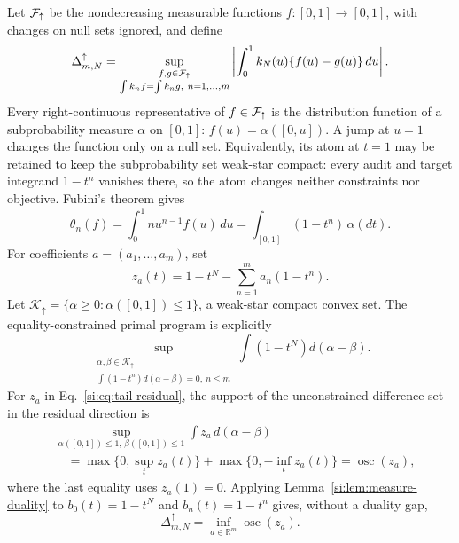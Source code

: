 Let $\mathcal F_\uparrow$ be the nondecreasing measurable functions $f:[0,1]\to[0,1]$, with changes on null sets ignored, and define
\begin{equation}
\Delta^\uparrow_{m,N}
=\sup_{\substack{f,g\in\mathcal F_\uparrow\\
\int k_nf=\int k_ng,\ n=1,\ldots,m}}
\left|\int_0^1 k_N(u)\{f(u)-g(u)\}\,du\right|.
\label{si:eq:monotone-ambiguity}
\end{equation}
Every right-continuous representative of $f\in\mathcal F_\uparrow$ is the distribution function of a subprobability measure $\alpha$ on $[0,1]$: $f(u)=\alpha([0,u])$. A jump at $u=1$ changes the function only on a null set. Equivalently, its atom at $t=1$ may be retained to keep the subprobability set weak-star compact: every audit and target integrand $1-t^n$ vanishes there, so the atom changes neither constraints nor objective. Fubini's theorem gives
\begin{equation}
\theta_n(f)
=\int_0^1nu^{n-1}f(u)\,du
=\int_{[0,1]}(1-t^n)\,\alpha(dt).
\label{si:eq:cdf-tail-moments}
\end{equation}
For coefficients $a=(a_1,\ldots,a_m)$, set
\begin{equation}
z_a(t)=1-t^N-\sum_{n=1}^ma_n(1-t^n).
\label{si:eq:tail-residual}
\end{equation}
Let $\mathcal K_\uparrow=\{\alpha\ge0:\alpha([0,1])\le1\}$, a weak-star compact
convex set. The equality-constrained primal program is explicitly
\begin{equation}
\sup_{\substack{\alpha,\beta\in\mathcal K_\uparrow\\
\int(1-t^n)d(\alpha-\beta)=0,\ n\le m}}
\int(1-t^N)d(\alpha-\beta).
\label{si:eq:monotone-measure-primal}
\end{equation}
For $z_a$ in Eq.~\ref{si:eq:tail-residual}, the support of the unconstrained
difference set in the residual direction is
\begin{align}
&\sup_{\alpha([0,1])\le1,\,\beta([0,1])\le1}
\int z_a\,d(\alpha-\beta)\nonumber\\
&\quad=\max\{0,\sup_tz_a(t)\}+\max\{0,-\inf_tz_a(t)\}
=\operatorname{osc}(z_a),
\label{si:eq:osc-support}
\end{align}
where the last equality uses $z_a(1)=0$. Applying
Lemma~\ref{si:lem:measure-duality} to
$b_0(t)=1-t^N$ and $b_n(t)=1-t^n$ gives, without a duality gap,
\begin{equation}
\Delta^\uparrow_{m,N}=\inf_{a\in\mathbb R^m}\operatorname{osc}(z_a).
\label{si:eq:monotone-osc-dual}
\end{equation}

